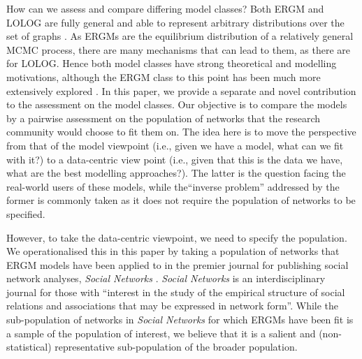 \documentclass[
]{statsoc}
\begin{document}
How can we assess and compare differing model classes? Both ERGM and
LOLOG are fully general and able to represent arbitrary distributions
over the set of graphs \citep[][Theorem 1]{Fellows2018}. As ERGMs are
the equilibrium distribution of a relatively general MCMC process, there
are many mechanisms that can lead to them, as there are for LOLOG. Hence
both model classes have strong theoretical and modelling motivations,
although the ERGM class to this point has been much more extensively
explored \citep{schweinberger2020,Schweinberger2017ExponentialFamilyMO}.
In this paper, we provide a separate and novel contribution to the
assessment on the model classes. Our objective is to compare the models
by a pairwise assessment on the population of networks that the research
community would choose to fit them on. The idea here is to move the
perspective from that of the model viewpoint (i.e., given we have a
model, what can we fit with it?) to a data-centric view point (i.e.,
given that this is the data we have, what are the best modelling
approaches?). The latter is the question facing the real-world users of
these models, while the``inverse problem'' addressed by the former is
commonly taken as it does not require the population of networks to be
specified.

However, to take the data-centric viewpoint, we need to specify the
population. We operationalised this in this paper by taking a population
of networks that ERGM models have been applied to in the premier journal
for publishing social network analyses, \textit{Social Networks}
\citep{socialnetworks}. \textit{Social Networks} is an interdisciplinary
journal for those with ``interest in the study of the empirical
structure of social relations and associations that may be expressed in
network form''. While the sub-population of networks in
\textit{Social Networks} for which ERGMs have been fit is a sample of
the population of interest, we believe that it is a salient and
(non-statistical) representative sub-population of the broader
population.
\end{document}

